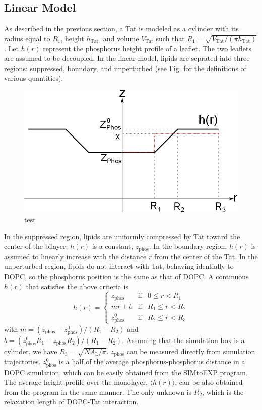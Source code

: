 \documentclass[12pt,letterpaper]{article}
\newcommand{\zphos}{z_\textrm{phos}}
\newcommand{\VTat}{V_\textrm{Tat}}
\newcommand{\AL}{A_\textrm{L}}
\newcommand{\hTat}{h_\mathrm{Tat}}
\begin{document}
\subsection{Linear Model}
As described in the previous section, a Tat is modeled as a cylinder with 
its radius equal to $R_1$, height $\hTat$,
and volume $\VTat$ such that $R_1=\sqrt{\VTat/(\pi \hTat)}$. 
Let $h(r)$ represent the phosphorus height profile
of a leaflet. The two leaflets are assumed to be decoupled.
In the linear model, lipids are seprated into three regions: 
suppressed, boundary, and unperturbed (see Fig. for the definitions
of various quantities). 
\begin{figure}[htbp]
  \centering
  \includegraphics[scale=0.5]{./figures/linear_model.png}
  \caption{test}
  \label{fig:linear_model}
\end{figure}
In the suppressed region,
lipids are uniformly compressed by Tat toward the center of the bilayer; 
$h(r)$ is a constant, $\zphos$. In the boundary region, $h(r)$ is assumed to 
linearly increase with the distance $r$ from the center of the Tat. In
the unperturbed region, lipids do not interact with Tat, behaving
identially to DOPC, so the phosphorus position is the same as that of 
DOPC. A continuous $h(r)$ that 
satisfies the above criteria is
\begin{equation}
  h(r) = \left\{ 
  \begin{array}{lcr}
    \zphos   & \text{if} & 0   \leq r < R_1 \\
    mr+b     & \text{if} & R_1 \leq r < R_2 \\
    \zphos^0 & \text{if} & R_2 \leq r < R_3 
  \end{array}\right.  
\end{equation}     
with $m=(\zphos-\zphos^0)/(R_1-R_2)$ and $b=(\zphos^0R_1-\zphos R_2)/(R_1-R_2)$. 
Assuming that the simulation box is a cylinder, we have 
$R_3=\sqrt{N\AL/\pi}$. $\zphos$ can be measured directly from simulation trajectories.
$\zphos^0$ is a half of the average phosphorus-phosphorus distance in a DOPC simulation,
which can be easily obtained from the SIMtoEXP program. The average height profile over
the monolayer, $\langle h(r) \rangle$, can be also obtained from the program in the same manner. 
The only unknown is $R_2$, which is the relaxation length of DOPC-Tat interaction.
\end{document}

